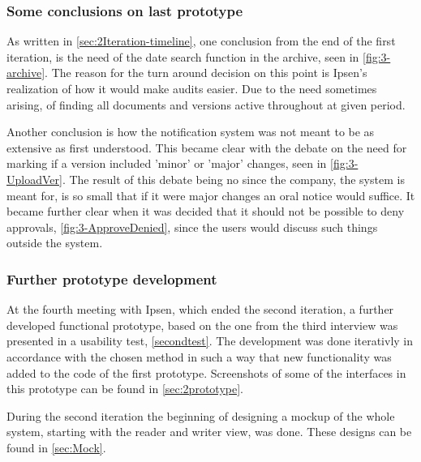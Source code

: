 \subsubsection*{Some conclusions on last prototype}
As written in \cref{sec:2Iteration-timeline}, one conclusion from the end of the first iteration, is the need of the date search function in the archive, seen in \cref{fig:3-archive}.
The reason for the turn around decision on this point is Ipsen's realization of how it would make audits easier.
Due to the need sometimes arising, of finding all documents and versions active throughout at given period.

Another conclusion is how the notification system was not meant to be as extensive as first understood. 
This became clear with the debate on the need for marking if a version included 'minor' or 'major' changes, seen in \cref{fig:3-UploadVer}.
The result of this debate being no since the company, the system is meant for, is so small that if it were major changes an oral notice would suffice.
It became further clear when it was decided that it should not be possible to deny approvals, \cref{fig:3-ApproveDenied}, since the users would discuss such things outside the system.

\subsubsection*{Further prototype development}
At the fourth meeting with Ipsen, which ended the second iteration, a further developed functional prototype, based on the one from the third interview was presented in a usability test, \cref{secondtest}.
The development was done iterativly in accordance with the chosen method in such a way that new functionality was added to the code of the first prototype.
Screenshots of some of the interfaces in this prototype can be found in \cref{sec:2prototype}.

During the second iteration the beginning of designing a mockup of the whole system, starting with the reader and writer view, was done. 
These designs can be found in \cref{sec:Mock}.
